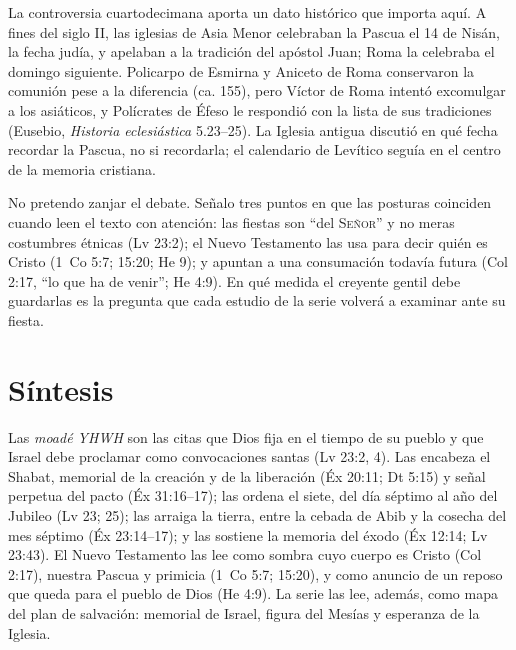 \documentclass[11pt,letterpaper]{article}
\newcommand{\SENOR}{\textsc{Señor}}
\begin{document}
La controversia cuartodecimana aporta un dato histórico que importa aquí. A fines del siglo II, las iglesias de Asia Menor celebraban la Pascua el 14 de Nisán, la fecha judía, y apelaban a la tradición del apóstol Juan; Roma la celebraba el domingo siguiente. Policarpo de Esmirna y Aniceto de Roma conservaron la comunión pese a la diferencia (ca. 155), pero Víctor de Roma intentó excomulgar a los asiáticos, y Polícrates de Éfeso le respondió con la lista de sus tradiciones (Eusebio, \emph{Historia eclesiástica} 5.23--25). La Iglesia antigua discutió en qué fecha recordar la Pascua, no si recordarla; el calendario de Levítico seguía en el centro de la memoria cristiana.

No pretendo zanjar el debate. Señalo tres puntos en que las posturas coinciden cuando leen el texto con atención: las fiestas son ``del \SENOR'' y no meras costumbres étnicas (Lv 23:2); el Nuevo Testamento las usa para decir quién es Cristo (1~Co 5:7; 15:20; He 9); y apuntan a una consumación todavía futura (Col 2:17, ``lo que ha de venir''; He 4:9). En qué medida el creyente gentil debe guardarlas es la pregunta que cada estudio de la serie volverá a examinar ante su fiesta.

\section{Síntesis}\label{sec:sintesis}

\begin{tcolorbox}[enhanced,unbreakable,colback=papiro,colframe=tierraroja,boxrule=1pt,arc=3pt,fonttitle=\bfseries,title={Las solemnidades del \SENOR: definición}]
Las \emph{moadé YHWH} son las citas que Dios fija en el tiempo de su pueblo y que Israel debe proclamar como convocaciones santas (Lv 23:2, 4). Las encabeza el Shabat, memorial de la creación y de la liberación (Éx 20:11; Dt 5:15) y señal perpetua del pacto (Éx 31:16--17); las ordena el siete, del día séptimo al año del Jubileo (Lv 23; 25); las arraiga la tierra, entre la cebada de Abib y la cosecha del mes séptimo (Éx 23:14--17); y las sostiene la memoria del éxodo (Éx 12:14; Lv 23:43). El Nuevo Testamento las lee como sombra cuyo cuerpo es Cristo (Col 2:17), nuestra Pascua y primicia (1~Co 5:7; 15:20), y como anuncio de un reposo que queda para el pueblo de Dios (He 4:9). La serie las lee, además, como mapa del plan de salvación: memorial de Israel, figura del Mesías y esperanza de la Iglesia.
\end{tcolorbox}
\end{document}
